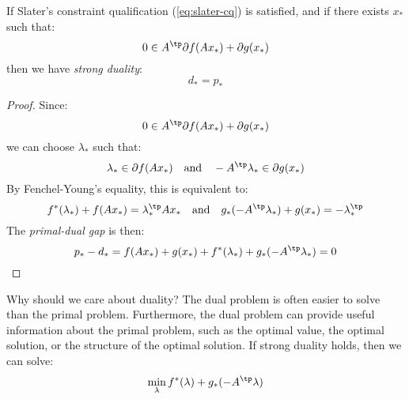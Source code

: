 \begin{property}
    If Slater's constraint qualification (\eqref{eq:slater-cq}) is satisfied, and if there exists $x_*$ such that:
    \begin{equation*}
        0\in A^\tp\partial f(Ax_*) + \partial g(x_*)
    \end{equation*}
    then we have \emph{strong duality}:
    \begin{equation}
        d_* = p_*
    \end{equation}
\end{property}
\begin{proof}
    Since:
    \begin{equation*}
        0\in A^\tp\partial f(Ax_*) + \partial g(x_*)
    \end{equation*}
    we can choose $\lambda_*$ such that:
    \begin{equation*}
        \lambda_*\in\partial f(Ax_*) \quad\text{and}\quad-A^\tp\lambda_*\in\partial g(x_*)
    \end{equation*}
    By Fenchel-Young's equality, this is equivalent to:
    \begin{equation*}
        f^*(\lambda_*) + f(Ax_*) = \lambda_*^\tp Ax_* \quad\text{and}\quad g_*(-A^\tp\lambda_*) + g(x_*) = -\lambda_*^\tp
    \end{equation*}
    The \emph{primal-dual gap} is then:
    \begin{equation*}
        p_*-d_* = f(Ax_*) + g(x_*) + f^*(\lambda_*) + g_*(-A^\tp\lambda_*) = 0
    \end{equation*}
\end{proof}

Why should we care about duality? The dual problem is often easier to solve than the primal problem. Furthermore, the dual problem can provide useful information about the primal problem, such as the optimal value, the optimal solution, or the structure of the optimal solution. If strong duality holds, then we can solve:
\begin{equation*}
    \min_\lambda f^*(\lambda) + g_*(-A^\tp\lambda)
\end{equation*}

